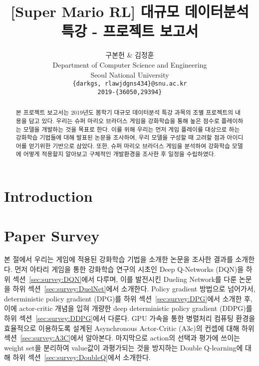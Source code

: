 \documentclass[10pt]{article}
\begin{document}
\title{[Super Mario RL] 대규모 데이터분석 특강 - 프로젝트 보고서}

\author{
구본헌 \& 김정훈\\
Department of Computer Science and Engineering\\
Seoul National University\\
\texttt{\{darkgs, rlawjdgns434\}@snu.ac.kr}\\
\texttt{2019-\{36050,29394\}}\\
}

\renewcommand{\baselinestretch}{1.25}

\maketitle
\begin{abstract}
본 프로젝트 보고서는 2019년도 봄학기 대규모 데이터분석 특강 과목의 조별 프로젝트의 내용을 담고 있다.
우리는 슈퍼 마리오 브라더스 게임을 강화학습을 통해 높은 점수로 플레이하는 모델을 개발하는 것을 목표로 한다.
이를 위해 우리는 먼저 게임 플레이를 대상으로 하는 강화학습 기법들에 대해 발표된 논문을 조사하여, 우리 모델을 구성할 때 고려할 점과 아이디어를 얻기위한 기반으로 삼았다.
또한, 슈퍼 마리오 브라더스 게임을 분석하여 강화학습 모델에 어떻게 적용할지 알아보고 구체적인 개발환경을 조사한 후 일정을 수립하였다.
\end{abstract}



\section{Introduction}
\label{sec:intro}


\section{Paper Survey}
본 절에서 우리는 게임에 적용된 강화학습 기법을 소개한 논문을 조사한 결과를 소개한다.
먼저 아타리 게임을 통한 강화학습 연구의 시초인 Deep Q-Networks (DQN)을 하위 섹션~\ref{sec:survey:DQN}에서 다루며, 이를 발전시킨 Dueling Network를 다룬 논문을 하위 섹션~\ref{sec:survey:DuelNet}에서 소개한다.
Policy gradient 방법으로 넘어가서, deterministic policy gradient (DPG)를 하위 섹션~\ref{sec:survey:DPG}에서 소개한 후,
이에 actor-critic 개념을 입혀 개량한 deep deterministic policy gradient (DDPG)를 하위 섹션~\ref{sec:survey:DDPG}에서 다룬다.
GPU 가속을 통한 병렬처리 컴퓨팅 환경을 효율적으로 이용하도록 설계된 Asynchronous Actor-Critic (A3c)의 컨셉에 대해 하위 섹션~\ref{sec:survey:A3C}에서 알아본다.
마지막으로 action의 선택과 평가에 쓰이는 weight set을 분리하여 value값이 과평가되는 것을 방지하는 Double Q-learning에 대해 하위 섹션~\ref{sec:survey:DoubleQ}에서 소개한다.
\label{sec:survey}






\end{document}
